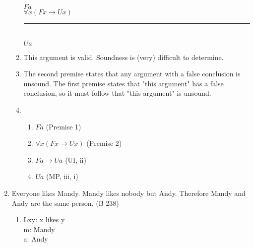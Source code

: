 \documentclass{article}
\begin{document}
\begin{enumerate}
\begin{enumerate}
                        $Fa$\\
                        $\forall x(Fx \to Ux)$\\
                        \rule{15em}{.5pt}\\
                        $Ua$
                  \item This argument is valid. Soundness is (very) difficult to determine.
                  \item The second premise states that any argument with a false conclusion is unsound. The first premise states that "this argument" has a false conclusion, so it must follow that "this argument" is unsound.
                  \item \begin{enumerate}
                              \item $Fa$ (Premise 1)
                              \item $\forall x(Fx \to Ux)$ (Premise 2)
                              \item $Fa \to Ua$ (UI, ii)
                              \item $Ua$ (MP, iii, i)
                        \end{enumerate}
            \end{enumerate}
      \item Everyone likes Mandy. Mandy likes nobody but Andy. Therefore Mandy and Andy are the same person. (B 238)
            \begin{enumerate}
                  \item Lxy: x likes y\\
                        m: Mandy\\
                        a: Andy\\


\end{enumerate}
\end{enumerate}
\end{document}
